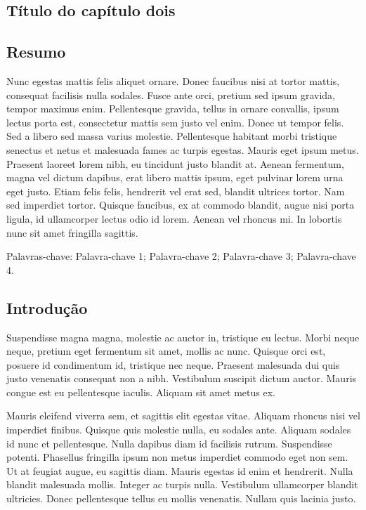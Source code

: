 \begin{btUnit}
\chapter{Título do capítulo dois}

\section*{Resumo}

Nunc egestas mattis felis aliquet ornare. Donec faucibus nisi at
tortor mattis, consequat facilisis nulla sodales. Fusce ante orci,
pretium sed ipsum gravida, tempor maximus enim. Pellentesque gravida,
tellus in ornare convallis, ipsum lectus porta est, consectetur mattis
sem justo vel enim. Donec ut tempor felis. Sed a libero sed massa
varius molestie. Pellentesque habitant morbi tristique senectus et
netus et malesuada fames ac turpis egestas. Mauris eget ipsum metus.
Praesent laoreet lorem nibh, eu tincidunt justo blandit at. Aenean
fermentum, magna vel dictum dapibus, erat libero mattis ipsum, eget
pulvinar lorem urna eget justo. Etiam felis felis, hendrerit vel erat
sed, blandit ultrices tortor. Nam sed imperdiet tortor. Quisque
faucibus, ex at commodo blandit, augue nisi porta ligula, id
ullamcorper lectus odio id lorem. Aenean vel rhoncus mi. In lobortis
nunc sit amet fringilla sagittis. \newline

\noindent Palavras-chave: Palavra-chave 1; Palavra-chave 2;
Palavra-chave 3; Palavra-chave 4.

\section{Introdução}

Suspendisse magna magna, molestie ac auctor in, tristique eu lectus.
Morbi neque neque, pretium eget fermentum sit amet, mollis ac nunc.
Quisque orci est, posuere id condimentum id, tristique nec neque.
Praesent malesuada dui quis justo venenatis consequat non a nibh.
Vestibulum suscipit dictum auctor. Mauris congue est eu pellentesque
iaculis. Aliquam sit amet metus ex.

Mauris eleifend viverra sem, et sagittis elit egestas vitae. Aliquam
rhoncus nisi vel imperdiet finibus. Quisque quis molestie nulla, eu
sodales ante. Aliquam sodales id nunc et pellentesque. Nulla dapibus
diam id facilisis rutrum. Suspendisse potenti. Phasellus fringilla
ipsum non metus imperdiet commodo eget non sem. Ut at feugiat augue,
eu sagittis diam. Mauris egestas id enim et hendrerit. Nulla blandit
malesuada mollis. Integer ac turpis nulla. Vestibulum ullamcorper
blandit ultricies. Donec pellentesque tellus eu mollis venenatis.
Nullam quis lacinia justo.


\end{btUnit}
